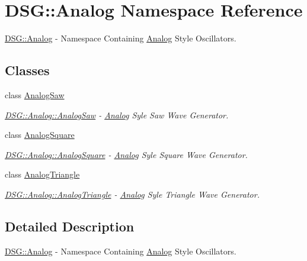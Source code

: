 \hypertarget{namespace_d_s_g_1_1_analog}{\section{D\+S\+G\+:\+:Analog Namespace Reference}
\label{namespace_d_s_g_1_1_analog}
}


\hyperlink{namespace_d_s_g_1_1_analog}{D\+S\+G\+::\+Analog} -\/ Namespace Containing \hyperlink{namespace_d_s_g_1_1_analog}{Analog} Style Oscillators.  


\subsection*{Classes}
\begin{DoxyCompactItemize}
\item 
class \hyperlink{class_d_s_g_1_1_analog_1_1_analog_saw}{Analog\+Saw}
\begin{DoxyCompactList}\small\item\em \hyperlink{class_d_s_g_1_1_analog_1_1_analog_saw}{D\+S\+G\+::\+Analog\+::\+Analog\+Saw} -\/ \hyperlink{namespace_d_s_g_1_1_analog}{Analog} Syle Saw Wave Generator. \end{DoxyCompactList}\item 
class \hyperlink{class_d_s_g_1_1_analog_1_1_analog_square}{Analog\+Square}
\begin{DoxyCompactList}\small\item\em \hyperlink{class_d_s_g_1_1_analog_1_1_analog_square}{D\+S\+G\+::\+Analog\+::\+Analog\+Square} -\/ \hyperlink{namespace_d_s_g_1_1_analog}{Analog} Syle Square Wave Generator. \end{DoxyCompactList}\item 
class \hyperlink{class_d_s_g_1_1_analog_1_1_analog_triangle}{Analog\+Triangle}
\begin{DoxyCompactList}\small\item\em \hyperlink{class_d_s_g_1_1_analog_1_1_analog_triangle}{D\+S\+G\+::\+Analog\+::\+Analog\+Triangle} -\/ \hyperlink{namespace_d_s_g_1_1_analog}{Analog} Syle Triangle Wave Generator. \end{DoxyCompactList}\end{DoxyCompactItemize}


\subsection{Detailed Description}
\hyperlink{namespace_d_s_g_1_1_analog}{D\+S\+G\+::\+Analog} -\/ Namespace Containing \hyperlink{namespace_d_s_g_1_1_analog}{Analog} Style Oscillators. 